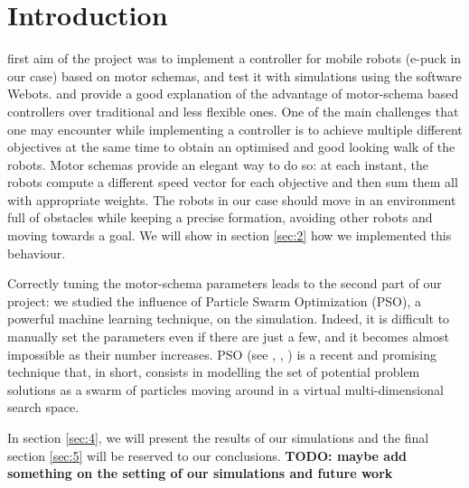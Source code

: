 \documentclass[journal]{IEEEtran}
\begin{document}
\section{Introduction}
\label {sec:1}
% 
% 
% 
% 
 first aim of the project was to implement a controller
for mobile robots (e-puck in our case) based on motor schemas, and test it with simulations
using the software
Webots\textregistered. \cite{IEEEhowto:arkin_motor_schemas} and 
\cite{IEEEhowto:balch_behaviour_based} provide a
good explanation of the advantage of motor-schema based
controllers over traditional and less flexible ones. One of the main challenges that one may encounter while implementing a controller
is to achieve multiple different objectives at the same time
to obtain an optimised and good looking walk of the robots. 
Motor schemas provide an elegant way to do so: at each instant, the
robots compute a different speed vector for each objective and then
sum them all with appropriate weights. 
The robots in our case should move in an environment full of obstacles while
keeping a precise formation, avoiding other robots and moving towards
a goal. We will show in section \ref{sec:2} how we implemented this behaviour.

Correctly tuning the motor-schema parameters leads to the second part of our project:
we studied the influence of Particle Swarm Optimization (PSO), a
powerful machine learning technique, on the simulation. Indeed, it is difficult to manually set the parameters even if there are just a few, and it becomes almost impossible as their number increases. PSO (see \cite{IEEEhowto:martinoli_pso},
\cite{IEEEhowto:martinoli_pso_noise},
\cite{IEEEhowto:martinoli_pso_noise_2}) is a recent and promising
technique that, in short, consists in modelling the set of potential
problem solutions as a swarm of particles moving around in a virtual multi-dimensional
search space. 

In section \ref{sec:4}, we will present the results of our
simulations and the final section \ref{sec:5} will be reserved to our conclusions. 
\textbf{TODO: maybe add something on the setting of our simulations and future work}
\end{document}
